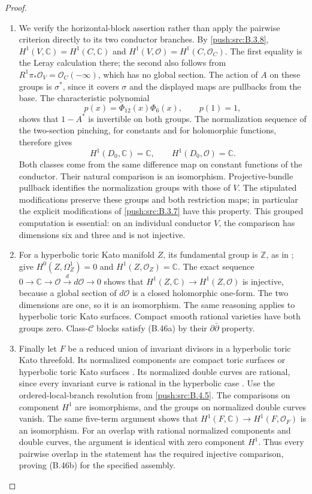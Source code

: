 \begin{proof}
\begin{enumerate}[label=\arabic*.,leftmargin=*]
\item We verify the horizontal-block assertion rather than
apply the pairwise criterion directly to its two
conductor branches. By \ref{push:src:B.3.8},
$H^1(V,\mathbb C)=H^1(C,\mathbb C)$ and
$H^1(V,\mathcal O)=H^1(C,\mathcal O_C)$.
The first equality is the Leray calculation there;
the second also follows from
$R^1\pi_*\mathcal O_V=\mathcal O_C(-\infty)$,
which has no global section. The action of $A$ on
these groups is $\sigma^*$, since it covers $\sigma$
and the displayed maps are pullbacks from the base.
The characteristic polynomial
\[
 p(x)=\Phi_{12}(x)\Phi_6(x),\qquad p(1)=1,
\]
shows that $1-A^*$ is invertible on both groups.
The normalization sequence of the two-section
pinching, for constants and for holomorphic
functions, therefore gives
\[
 H^1(D_0,\mathbb C)=\mathbb C,
 \qquad H^1(D_0,\mathcal O)=\mathbb C.
\]
Both classes come from the same difference map on
constant functions of the conductor. Their natural
comparison is an isomorphism. Projective-bundle
pullback identifies the normalization groups with
those of $V$. The stipulated modifications preserve
these groups and both restriction maps; in particular
the explicit modifications of \ref{push:src:B.3.7} have this property.
This grouped computation is essential: on an individual
conductor $V$, the comparison has dimensions six and
three and is not injective.

\item For a hyperbolic toric Kato manifold $Z$, its
fundamental group is $\mathbb Z$, as in
\cite[Section 2, p.1352]{IstratiEtAl2022Root};
\cite[Proposition 8.4 and Theorem 8.5]{IstratiEtAl2022Root}
give $H^0(Z,\Omega_Z^1)=0$ and
$H^1(Z,\mathcal O_Z)=\mathbb C$.
The exact sequence
$0\to\mathbb C\to\mathcal O\xrightarrow{d}d\mathcal O\to0$
shows that $H^1(Z,\mathbb C)\to H^1(Z,\mathcal O)$
is injective, because a global section of
$d\mathcal O$ is a closed holomorphic one-form.
The two dimensions are one, so it is an isomorphism.
The same reasoning applies to hyperbolic toric Kato
surfaces. Compact smooth rational varieties have
both groups zero. Class-$\mathcal C$ blocks satisfy
(B.46a) by their $\partial\bar\partial$ property.

\item Finally let $F$ be a reduced union of invariant
divisors in a hyperbolic toric Kato threefold.
Its normalized components are compact toric surfaces
or hyperbolic toric Kato surfaces
\cite[proof of Theorem 8.8, p.1380]{IstratiEtAl2022Root}.
Its normalized double curves are rational, since
every invariant curve is rational in the hyperbolic
case \cite[Theorem 5.2]{IstratiEtAl2022Root}.
Use the ordered-local-branch resolution from \ref{push:src:B.4.5}.
The comparisons on component $H^1$ are isomorphisms,
and the groups on normalized double curves vanish.
The same five-term argument shows that
$H^1(F,\mathbb C)\to H^1(F,\mathcal O_F)$ is an
isomorphism. For an overlap with rational normalized
components and double curves, the argument is
identical with zero component $H^1$. Thus every
pairwise overlap in the statement has the required
injective comparison, proving (B.46b) for the
specified assembly.


\end{enumerate}
\end{proof}
